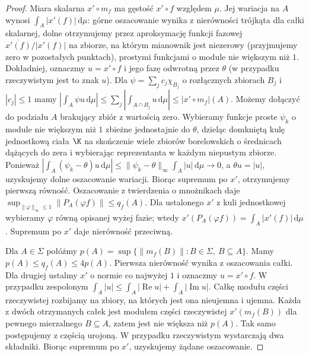 \begin{proof}
Miara skalarna $x'\circ m_f$ ma gęstość $x'\circ f$
względem $\mu$. Jej wariacja na $A$ wynosi
$\int_A|x'(f)|\,\mathrm d\mu$: górne oszacowanie wynika
z nierówności trójkąta dla całki skalarnej, dolne
otrzymujemy przez aproksymację funkcji fazowej
$\overline{x'(f)}/|x'(f)|$ na zbiorze, na którym mianownik
jest niezerowy (przyjmujemy zero w pozostałych punktach),
prostymi funkcjami o module nie większym niż $1$.
Dokładniej, oznaczmy $u=x'\circ f$ i jego fazę odwrotną
przez $\theta$ (w przypadku rzeczywistym jest to znak $u$).
Dla $\psi=\sum_j c_j\chi_{B_j}$ o rozłącznych zbiorach
$B_j$ i $|c_j|\le1$ mamy
$|\int_A\psi u\,\mathrm d\mu|
\le\sum_j|\int_{A\cap B_j}u\,\mathrm d\mu|
\le|x'\circ m_f|(A)$.
Możemy dołączyć do podziału $A$ brakujący zbiór z wartością
zero. Wybieramy funkcje proste $\psi_k$ o module nie
większym niż $1$ zbieżne jednostajnie do $\theta$,
dzieląc domkniętą kulę jednostkową ciała $\K$ na skończenie
wiele zbiorów borelowskich o średnicach dążących do zera
i wybierając reprezentanta w każdym niepustym zbiorze.
Ponieważ $|\int_A(\psi_k-\theta)u\,\mathrm d\mu|
\le\|\psi_k-\theta\|_\infty\int_A|u|\,\mathrm d\mu\to0$,
a $\theta u=|u|$, uzyskujemy dolne oszacowanie wariacji. Biorąc supremum po $x'$,
otrzymujemy pierwszą równość.
Oszacowanie z twierdzenia o mnożnikach daje
$\sup_{\|\varphi\|_\infty\le1}\|P_A(\varphi f)\|\le q_f(A)$.
Dla ustalonego $x'$ z kuli jednostkowej wybieramy
$\varphi$ równą opisanej wyżej fazie; wtedy
$x'(P_A(\varphi f))=\int_A|x'(f)|\,\mathrm d\mu$.
Supremum po $x'$ daje nierówność przeciwną.

Dla $A\in\Sigma$ połóżmy
$p(A)=\sup\{\|m_f(B)\|:B\in\Sigma,\ B\subseteq A\}$.
Mamy $p(A)\le q_f(A)\le4p(A)$.
Pierwsza nierówność wynika z oszacowania całki.
Dla drugiej ustalmy $x'$ o normie co najwyżej $1$ i
oznaczmy $u=x'\circ f$. W przypadku zespolonym
$\int_A|u|\le\int_A|\operatorname{Re}u|
+\int_A|\operatorname{Im}u|$.
Całkę modułu części rzeczywistej rozbijamy na zbiory,
na których jest ona nieujemna i ujemna. Każda z dwóch
otrzymanych całek jest modułem części rzeczywistej
$x'(m_f(B))$ dla pewnego mierzalnego $B\subseteq A$,
zatem jest nie większa niż $p(A)$. Tak samo postępujemy
z częścią urojoną. W przypadku rzeczywistym wystarczają
dwa składniki. Biorąc supremum po $x'$, uzyskujemy
żądane oszacowanie.


\end{proof}
